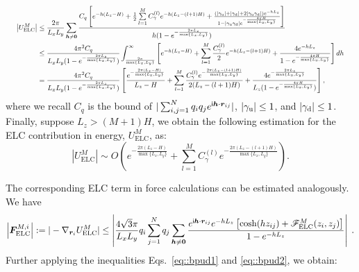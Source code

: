 \begin{equation}
\resizebox{.98\hsize}{!}{$
\begin{split}
\left|U_{\text{ELC}}^{M}\right|&\leq \frac{2\pi}{L_xL_y}\sum_{\bm{h}\neq \bm{0}} \frac{C_q\left[e^{-h(L_z-H)}+\frac{1}{2}\sum\limits_{l=1}^{M}C^{(l)}_{\gamma}e^{-h(L_z-(l+1)H)}+\frac{(|\gamma_{\T u}|+|\gamma_{\T d}| + 2|\gamma_{\T u}\gamma_{\T d}|)e^{-hL_z}}{1-|\gamma_{\T u}\gamma_{\T d}|e^{-\frac{4\pi H}{\max\{L_x,L_y\}}}}\right]}{h(1-e^{-\frac{2\pi L_z}{\max\{L_x,L_y\}}})}\\
&\leq \frac{4\pi^2 C_q}{L_xL_y(1-e^{-\frac{2\pi L_z}{\max\{L_x,L_y\}}})}\int^{\infty}_{\frac{2\pi}{\max\{L_x,L_y\}}} \left[e^{-h(L_z-H)}+\sum\limits_{l=1}^{M}\frac{C^{(l)}_{\gamma}}{2}e^{-h(L_z-(l+1)H)}+\frac{4e^{-hL_z}}{1-e^{-\frac{4\pi H}{\max\{L_x,L_y\}}}}\right]dh\\
&=\frac{4\pi^2 C_q}{L_xL_y(1-e^{-\frac{2\pi L_z}{\max\{L_x,L_y\}}})}\left[\frac{e^{-\frac{2\pi(L_z-H)}{\max\{L_x,L_y\}}}}{L_z-H}+\sum_{l=1}^{M}\frac{C_{\gamma}^{(l)}e^{-\frac{2\pi(L_z-(l+1)H)}{\max\{L_x,L_y\}}}}{2(L_z-(l+1)H)}+\frac{4e^{-\frac{2\pi L_z}{\max\{L_x,L_y\}}}}{L_z(1-e^{-\frac{4\pi H}{\max\{L_x,L_y\}}})} \right],
\end{split}
$}
\end{equation}
where we recall $C_q$ is the bound of $|\sum_{i,j=1}^{N}q_iq_je^{\mathsf i \bm{h}\cdot\bm{r}_{ij}}|$, $\left|\gamma_{\text{u}}\right|\leq 1$, and $\left|\gamma_{\text{d}}\right|\leq 1$. 
Finally, suppose $L_z>(M+1)H$, we obtain the following estimation for the ELC contribution in energy, $U_{\text{ELC}}^{M}$, as:
\begin{equation}
\label{eq::U_ELC}
\left|U_{\text{ELC}}^{M}\right|\sim O\left(e^{-\frac{2\pi(L_z-H)}{\max\{L_x,L_y\}}}+\sum_{l=1}^{M}C_{\gamma}^{(l)}e^{-\frac{2\pi(L_z-(l+1)H)}{\max\{L_x,L_y\}}}\right).
\end{equation}

The corresponding ELC term in force calculations can be estimated analogously. 
We have
\begin{equation}
\left|\bm{F}_{\text{ELC}}^{M,i}\right|:=|-\nabla_{\bm{r}_i} U_{\text{ELC}}^{M}|\leq \left|\frac{4\sqrt{3}\pi}{L_xL_y}q_i\sum_{j=1}^{N}q_j\sum_{\bm{h}\neq \bm{0}} \frac{e^{\mathsf i \bm{h}\cdot\bm{r}_{ij}}e^{-hL_z}\left[\cosh(hz_{ij})+\mathscr{F}_{\text{ELC}}^{M}(z_i,z_j)\right]}{1-e^{-hL_z}}\right|\;.
\end{equation}
Further applying the inequalities Eqs.~\eqref{eq::bpud1} and \eqref{eq::bpud2}, we obtain:

